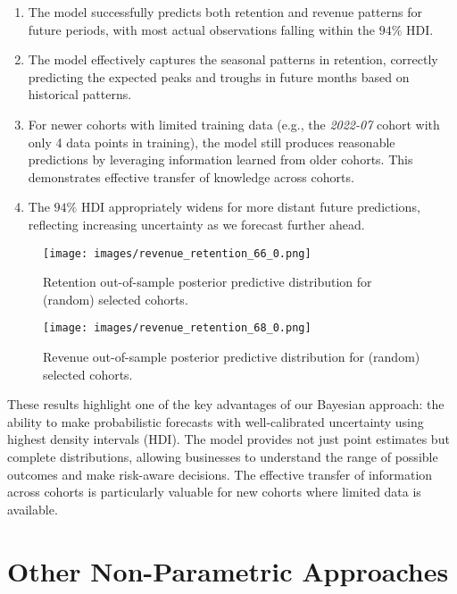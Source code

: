 \documentclass[11pt]{amsart}
\theoremstyle{definition}
\begin{document}
\begin{enumerate}
    \item The model successfully predicts both retention and revenue patterns for future periods, with most actual
          observations falling within the $94\%$ HDI.

    \item The model effectively captures the seasonal patterns in retention, correctly predicting the expected peaks and
          troughs in future months based on historical patterns.

    \item For newer cohorts with limited training data (e.g., the {\em 2022-07} cohort with only 4 data points in
          training), the model still produces reasonable predictions by leveraging information learned from older cohorts.
          This demonstrates effective transfer of knowledge across cohorts.

    \item The $94\%$ HDI appropriately widens for more distant future predictions, reflecting increasing uncertainty as we
          forecast further ahead. \\
\end{enumerate}

\begin{figure}
    \centering
    \texttt{[image: images/revenue\_retention\_66\_0.png]}
    \caption{Retention out-of-sample posterior predictive distribution for (random) selected cohorts.}
    \label{fig:out_sample_retention}
\end{figure}

\begin{figure}
    \centering
    \texttt{[image: images/revenue\_retention\_68\_0.png]}
    \caption{Revenue out-of-sample posterior predictive distribution for (random) selected cohorts.}
    \label{fig:out_sample_revenue}
\end{figure}

These results highlight one of the key advantages of our Bayesian approach: the ability to make probabilistic forecasts with
well-calibrated uncertainty using highest density intervals (HDI). The model provides not just point estimates but complete
distributions, allowing businesses to understand the range of possible outcomes and make risk-aware decisions. The effective
transfer of information across cohorts is particularly valuable for new cohorts where limited data is available.

\section{Other Non-Parametric Approaches}
\end{document}
